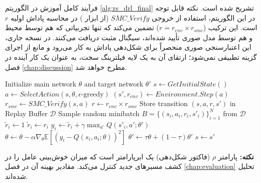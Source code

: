 \documentclass[oneside,openany,phd]{TMU-Thesis}
\begin{document}
فرآیند کامل آموزش در الگوریتم \ref{alg:rs_drl_final} تشریح شده است. نکته قابل توجه در این الگوریتم، استفاده از خروجی $SMC\_Verify$ (از ابزار ) در محاسبه پاداش اولیه $r$ است. این ترکیب ($r = r_{env} \times r_{smc}$) تضمین می‌کند که تنها تجربیاتی که هم توسط محیط و هم توسط مدل صوری تأیید شده‌اند، سیگنال مثبت دریافت می‌کنند. در نسخه جاری، این اعتبارسنجی صوری منحصراً برای شکل‌دهی پاداش به کار می‌رود و مانع از اجرای گزینه تطبیقی نمی‌شود؛ ارتقای آن به یک لایه فیلترینگ سخت، به عنوان یک کار آینده در فصل \ref{chap:discussion} مطرح خواهد شد.

\begin{algorithm}[H]
\caption{الگوریتم ۱: آموزش و به‌روزرسانی جامع }
\label{alg:rs_drl_final}
\begin{algorithmic}[1]
\STATE Initialize main network $\theta$ and target network $\theta'$
  \STATE $s \leftarrow GetInitialState()$
    \STATE $a \leftarrow SelectAction(s, \theta, \epsilon\text{-greedy})$
    \STATE $(s', r_{env}) \leftarrow Environment.Step(a)$
    \STATE $r_{smc} \leftarrow SMC\_Verify(s, a)$ 
    \STATE $r \leftarrow r_{env} \times r_{smc}$ 
    \STATE Store transition $(s, a, r, s')$ in Replay Buffer $\mathcal{D}$
    \STATE Sample random minibatch $B = \{(s_i, a_i, r_i, s'_i)\}_{i=1}^N$ from $\mathcal{D}$
        \STATE $\tilde{r}_i \leftarrow 1$ 
      \ELSE
        \STATE $\tilde{r}_i \leftarrow r_i$
      \ENDIF
      \STATE $y_i \leftarrow \tilde{r}_i + \gamma \max_{a'} Q(s'_i, a'; \theta')$ 
      \STATE $\theta \leftarrow \theta - \alpha \nabla_\theta \mathbb{E}[(y_i - Q(s_i, a_i; \theta))^2]$
    \ENDFOR
    \STATE $\theta' \leftarrow \tau\theta + (1-\tau)\theta'$ 
    \STATE $s \leftarrow s'$
  \ENDWHILE
\ENDFOR
\end{algorithmic}
\begin{flushleft}
\footnotesize
\textbf{نکته:} پارامتر $\rho$ (فاکتور شکل‌دهی) یک ابرپارامتر است که میزان خوش‌بینی عامل را در کشف مسیرهای جدید کنترل می‌کند. مقادیر بهینه آن در فصل \ref{chap:evaluation} تحلیل شده‌اند.
\end{flushleft}
\end{algorithm}

\end{document}
